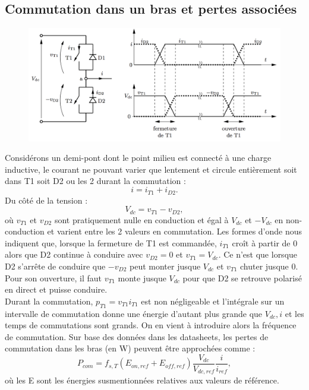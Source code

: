 	\subsection{Commutation dans un bras et pertes associées}
		\begin{figure}
		\vspace{-5mm}
		\includegraphics[scale=0.25]{ch4/10}
		\end{figure}
		Considérons un demi-pont dont le point milieu est connecté à une charge inductive, le courant ne pouvant varier que lentement et circule entièrement soit dans T1 soit D2 ou les 2 durant la commutation : 
		\begin{equation}
			i = i_{T1}+ i_{D2}.
		\end{equation}		 
		Du côté de la tension :
		\begin{equation}
			V_{dc} = v_{T1} - v_{D2},
		\end{equation}
		où $v_{T1}$ et $v_{D2}$ sont pratiquement nulle en conduction et égal à $V_{dc}$ et $-V_{dc}$ en non-conduction et varient entre les 2 valeurs en commutation. Les formes d'onde nous indiquent que, lorsque la fermeture de T1 est commandée, $i_{T1}$ croît à partir de 0 alors que D2 continue à conduire avec $v_{D2} = 0$ et $v_{T1} = V_{dc}$. Ce n'est que lorsque D2 s'arrête de conduire que $-v_{D2}$ peut monter jusque $V_{dc}$ et $v_{T1}$ chuter jusque 0. Pour son ouverture, il faut $v_{T1}$ monte jusque $V_{dc}$ pour que D2 se retrouve polarisé en direct et puisse conduire. \\
		
		Durant la commutation, $p_{T1} = v_{T1}i_{T1}$ est non négligeable et l'intégrale sur un intervalle de commutation donne une énergie d'autant plus grande que $V_{dc}, i$ et les temps de commutations sont grands. On en vient à introduire alors la fréquence de commutation. Sur base des données dans les datasheets, les pertes de commutation dans les bras (en W) peuvent être approchées comme :
		\begin{equation}
			P_{com} = f_{s,T} (E_{on,ref}+ E_{off,ref})\frac{V_{dc}}{V_{dc,ref}}\frac{i}{i_{ref}},
		\end{equation}
		où les E sont les énergies susmentionnées relatives aux valeurs de référence.
	
